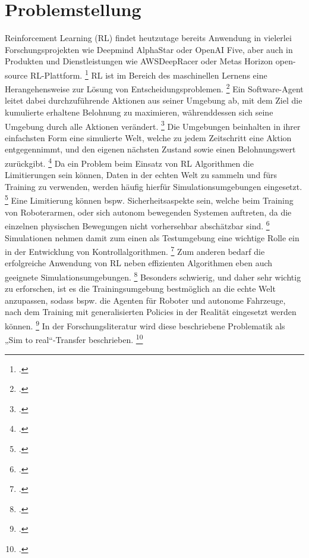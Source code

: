 \section{Problemstellung}

Reinforcement Learning (RL) findet heutzutage bereits Anwendung in vielerlei Forschungsprojekten wie Deepmind AlphaStar oder OpenAI Five, aber auch in Produkten und Dienstleistungen wie AWSDeepRacer oder Metas Horizon open-source RL-Plattform. \footcite[Vgl.][S. 4]{Li.2019}
RL ist im Bereich des maschinellen Lernens eine Herangehensweise zur Lösung von Entscheidungsproblemen. \footcite[Vgl.][S. 3]{Schuderer.2021}
Ein Software-Agent leitet dabei durchzuführende Aktionen aus seiner Umgebung ab, mit dem Ziel die kumulierte erhaltene Belohnung zu maximieren, währenddessen sich seine Umgebung durch alle Aktionen verändert. \footcite[Vgl.][S. 3]{Schuderer.2021}
Die Umgebungen beinhalten in ihrer einfachsten Form eine simulierte Welt, welche zu jedem Zeitschritt eine Aktion entgegennimmt, und den eigenen nächsten Zustand sowie einen Belohnungswert zurückgibt. \footcite[Vgl.][S. 1]{Reda.2020}
Da ein Problem beim Einsatz von RL Algorithmen die Limitierungen sein können, Daten in der echten Welt zu sammeln und fürs Training zu verwenden, werden häufig hierfür Simulationsumgebungen eingesetzt. \footcite[Vgl.][S. 737]{Zhao.2020}
Eine Limitierung können bspw. Sicherheitsaspekte sein, welche beim Training von Roboterarmen, oder sich autonom bewegenden Systemen auftreten, da die einzelnen physischen Bewegungen nicht vorhersehbar abschätzbar sind. \footcite[Vgl.][S. 738]{Zhao.2020}
Simulationen nehmen damit zum einen als Testumgebung eine wichtige Rolle ein in der Entwicklung von Kontrollalgorithmen. \footcite[Vgl.][S. 2]{Cutler.2014}
Zum anderen bedarf die erfolgreiche Anwendung von RL neben effizienten Algorithmen eben auch geeignete Simulationsumgebungen. \footcite[Vgl.][S. 8]{Reda.2020}
Besonders schwierig, und daher sehr wichtig zu erforschen, ist es die Trainingsumgebung bestmöglich an die echte Welt anzupassen, sodass bspw. die Agenten für Roboter und autonome Fahrzeuge, nach dem Training mit generalisierten Policies in der Realität eingesetzt werden können. \footcite[Vgl.][S. 1]{DBLP:journals/corr/abs-1910-10537}
In der Forschungsliteratur wird diese beschriebene Problematik als „Sim to real“-Transfer beschrieben. \footcite[Vgl.][S. 738]{Zhao.2020}

